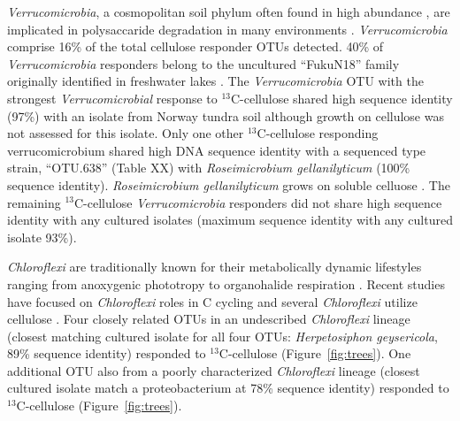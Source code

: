 \textit{Verrucomicrobia}, a cosmopolitan soil phylum often found in high
abundance \citep{Fierer_2013}, are implicated in polysaccaride degradation in
many environments \citep{Fierer_2013,Herlemann_2013,10543821}.
\textit{Verrucomicrobia} comprise 16\% of the total cellulose responder OTUs
detected. 40\% of \textit{Verrucomicrobia} responders belong to the uncultured
``FukuN18'' family originally identified in freshwater lakes
\citep{Parveen_2013}.  The \textit{Verrucomicrobia} OTU with the strongest
\textit{Verrucomicrobial} response to $^{13}$C-cellulose shared high sequence
identity (97\%) with an isolate from Norway tundra soil \citep{Jiang_2011}
although growth on cellulose was not assessed for this isolate. Only one other
$^{13}$C-cellulose responding verrucomicrobium shared high DNA sequence
identity with a sequenced type strain, ``OTU.638'' (Table XX) with
\textit{Roseimicrobium gellanilyticum} (100\% sequence identity).
\textit{Roseimicrobium gellanilyticum} grows on soluble celluose
\citep{Otsuka_2012}. The remaining $^{13}$C-cellulose \textit{Verrucomicrobia}
responders did not share high sequence identity with any cultured isolates
(maximum sequence identity with any cultured isolate 93\%). 

\textit{Chloroflexi} are traditionally known for their metabolically dynamic
lifestyles ranging from anoxygenic phototropy to organohalide respiration
\citep{Hug_2013}. Recent studies have focused on \textit{Chloroflexi} roles in
C cycling \citep{Hug_2013, Goldfarb_2011,Cole_2013} and several \textit{Chloroflexi} utilize cellulose \citep{Goldfarb_2011, Cole_2013,
Hug_2013}. Four closely related OTUs in an undescribed \textit{Chloroflexi}
lineage (closest matching cultured isolate for all four OTUs:
\textit{Herpetosiphon geysericola}, 89\% sequence identity) responded to
$^{13}$C-cellulose (Figure~\ref{fig:trees}). One additional OTU also from a
poorly characterized \textit{Chloroflexi} lineage (closest cultured isolate match a proteobacterium
at 78\% sequence identity) responded to $^{13}$C-cellulose
(Figure~\ref{fig:trees}).

